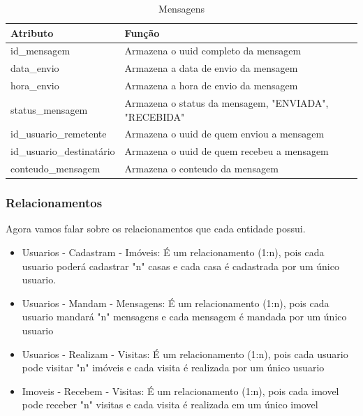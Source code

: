 \newpage
\begin{table}[htbp]
    \centering
    \caption{Mensagens}
    \begin{tabular}{|p{5cm}|p{10cm}|} 
        \hline
        \textbf{Atributo} & \textbf{Função} \\
        \hline
        id\_mensagem & Armazena o uuid completo da mensagem \\ 
        \hline
        data\_envio & Armazena a data de envio da mensagem \\ 
        \hline
        hora\_envio & Armazena a hora de envio da mensagem \\ 
        \hline
        status\_mensagem & Armazena o status da mensagem, "ENVIADA", "RECEBIDA" \\ 
        \hline
        id\_usuario\_remetente & Armazena o uuid de quem enviou a mensagem \\ 
        \hline
        id\_usuario\_destinatário & Armazena o uuid de quem recebeu a mensagem \\
        \hline
        conteudo\_mensagem & Armazena o conteudo da mensagem \\ 
        \hline
        
    \end{tabular}
    \label{tab:usuarios}
\end{table}

\subsubsection{Relacionamentos}

Agora vamos falar sobre os relacionamentos que cada entidade possui.

\begin{itemize}
    \item Usuarios - Cadastram - Imóveis: É um relacionamento (1:n), pois cada usuario poderá cadastrar "n" casas e cada casa é cadastrada por um
    único usuario.
    \item Usuarios - Mandam - Mensagens: É um relacionamento (1:n), pois cada usuario mandará "n" mensagens e cada mensagem é mandada por um único usuario
    \item Usuarios - Realizam - Visitas: É um relacionamento (1:n), pois cada usuario pode visitar "n" imóveis e cada visita é realizada por um único usuario
    \item Imoveis - Recebem - Visitas: É um relacionamento (1:n), pois cada imovel pode receber  "n" visitas e cada visita é realizada em um único imovel

\end{itemize}

